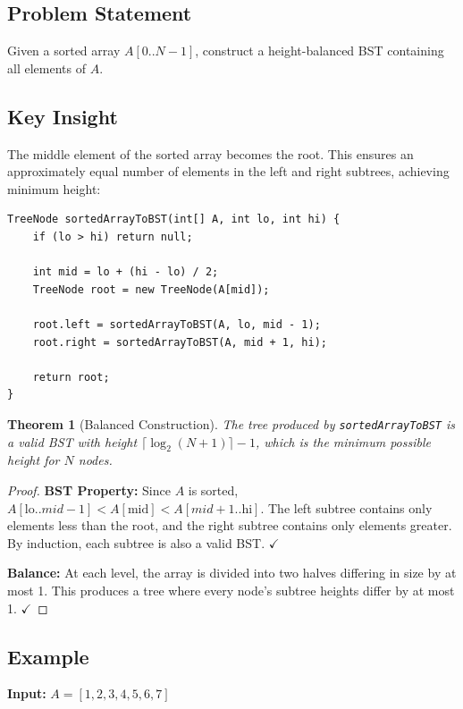 \documentclass[10pt,journal,compsoc,onecolumn]{IEEEtran}
\newtheorem{theorem}{Theorem}
\begin{document}
\subsection{Problem Statement}

Given a sorted array $A[0..N-1]$, construct a height-balanced BST containing all elements of $A$.

\subsection{Key Insight}

The middle element of the sorted array becomes the root. This ensures an approximately equal number of elements in the left and right subtrees, achieving minimum height:

\begin{verbatim}
TreeNode sortedArrayToBST(int[] A, int lo, int hi) {
    if (lo > hi) return null;
    
    int mid = lo + (hi - lo) / 2;
    TreeNode root = new TreeNode(A[mid]);
    
    root.left = sortedArrayToBST(A, lo, mid - 1);
    root.right = sortedArrayToBST(A, mid + 1, hi);
    
    return root;
}
\end{verbatim}

\begin{theorem}[Balanced Construction]
The tree produced by \texttt{sortedArrayToBST} is a valid BST with height $\lceil \log_2(N+1) \rceil - 1$, which is the minimum possible height for $N$ nodes.
\end{theorem}

\begin{proof}
\textbf{BST Property:} Since $A$ is sorted, $A[\text{lo}..mid-1] < A[\text{mid}] < A[mid+1..\text{hi}]$. The left subtree contains only elements less than the root, and the right subtree contains only elements greater. By induction, each subtree is also a valid BST. $\checkmark$

\textbf{Balance:} At each level, the array is divided into two halves differing in size by at most 1. This produces a tree where every node's subtree heights differ by at most 1. $\checkmark$
\end{proof}

\subsection{Example}

\textbf{Input:} $A = [1, 2, 3, 4, 5, 6, 7]$
\end{document}
